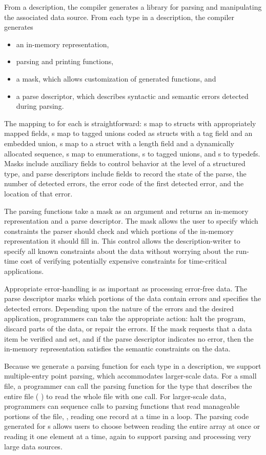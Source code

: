 From a description, the \pads{} compiler generates a \C{} library
for parsing and manipulating the associated data source.  
From each type in a \pads{} description, the compiler generates
\begin{itemize}
\setlength{\itemsep}{0ex plus0.2ex}
\item an in-memory representation, 
\item parsing and printing functions, 
\item a mask, which allows customization of generated functions, and
\item a parse descriptor, which describes syntactic and semantic errors detected during parsing.
\end{itemize}

The mapping to \C{} for each is straightforward: s map to
\C{} structs with appropriately mapped fields, s map to
tagged unions coded as \C{} structs with a tag field and an embedded
union, s map to a \C{} struct with a length field and a
dynamically allocated sequence, s map to \C{} enumerations,
s to tagged unions, and s to \C{} typedefs.
Masks include auxiliary fields to control behavior at the level of a
structured type, and parse descriptors include fields to record the
state of the parse, the number of detected errors, the error code of
the first detected error, and the location of that error.

The parsing functions take a mask as an argument and returns an
in-memory representation and a parse descriptor.  
The mask allows the user to specify 
which constraints the parser should check and which portions of the
in-memory representation it should fill in.  This control allows the
description-writer to specify all known constraints about the data
without worrying about the run-time cost of verifying potentially
expensive constraints for time-critical applications.

Appropriate error-handling is as important as processing error-free
data.  The parse descriptor marks which portions of the data contain
errors and specifies the detected errors.  Depending upon the nature
of the errors and the desired application, programmers can take the
appropriate action: halt the program, discard parts of the data, or
repair the errors.  If the mask requests that a data item be verified
and set, and if the parse descriptor indicates no error, then the
in-memory representation satisfies the semantic constraints on the
data.

Because we generate a parsing function for each type in a \pads{}
description, we support multiple-entry point parsing, which
accommodates larger-scale data.  For a small file, a programmer can
call the parsing function for the \pads{} type that describes the
entire file (\eg{} ) to read the whole file with
one call.  For larger-scale data, programmers can sequence calls to
parsing functions that read manageable portions of the file, \eg{},
reading one record at a time in a loop.  The parsing code generated for
s allows users to choose between reading the entire array
at once or reading it one element at a time, again to support parsing
and processing very large data sources.  
